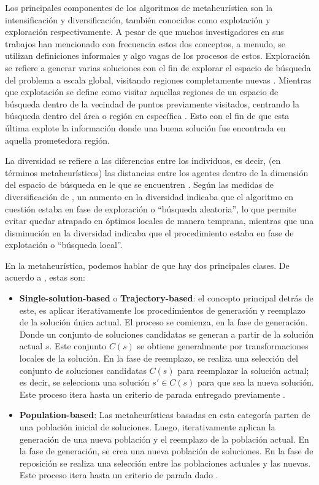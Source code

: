 Los principales componentes de los algoritmos de metaheurística son la intensificación y diversificación, también conocidos como explotación y exploración respectivamente. A pesar de que muchos investigadores en sus trabajos han mencionado con frecuencia estos dos conceptos, a menudo, se utilizan definiciones informales y algo vagas de los procesos de estos. Exploración se refiere a generar varias soluciones con el fin de explorar el espacio de búsqueda del problema a escala global, visitando regiones completamente nuevas \cite{metaheu-algo-modeling-optimization}. Mientras que explotación se define como visitar aquellas regiones de un espacio de búsqueda dentro de la vecindad de puntos previamente visitados, centrando la búsqueda dentro del área o región en específica \cite{10.1145/2480741.2480752}. Esto con el fin de que esta última explote la información donde una buena solución fue encontrada en aquella prometedora región.

La diversidad se refiere a las diferencias entre los individuos, es decir, (en términos metaheurísticos) las distancias entre los agentes dentro de la dimensión del espacio de búsqueda en le que se encuentren \cite{10.1145/2480741.2480752}. Según las medidas de diversificación de \cite{10.1145/2480741.2480752}, un aumento en la diversidad indicaba que el algoritmo en cuestión estaba en fase de exploración o ``búsqueda aleatoria'', lo que permite evitar quedar atrapado en óptimos locales de manera temprana, mientras que una disminución en la diversidad indicaba que el procedimiento estaba en fase de explotación o ``búsqueda local''.

En la metaheurística, podemos hablar de que hay dos principales clases. De acuerdo a \cite{10.5555/1718024}, estas son:
\begin{itemize}
    \item \textbf{Single-solution-based} o \textbf{Trajectory-based}: el concepto principal detrás de este, es aplicar iterativamente los procedimientos de generación y reemplazo de la solución única actual. El proceso se comienza, en la fase de generación. Donde un conjunto de soluciones candidatas se generan a partir de la solución actual $s$. Este conjunto $C(s)$ se obtiene generalmente por transformaciones locales de la solución. En la fase de reemplazo, se realiza una selección del conjunto de soluciones candidatas $C(s)$ para reemplazar la solución actual; es decir, se selecciona una solución $s' \in C(s)$ para que sea la nueva solución. Este proceso itera hasta un criterio de parada entregado previamente \cite{10.5555/1718024}.

    \item \textbf{Population-based}: Las metaheurísticas basadas en esta categoría parten de una población inicial de soluciones. Luego, iterativamente aplican la generación de una nueva población y el reemplazo de la población actual. En la fase de generación, se crea una nueva población de soluciones. En la fase de reposición se realiza una selección entre las poblaciones actuales y las nuevas. Este proceso itera hasta un criterio de parada dado \cite{10.5555/1718024}.

\end{itemize}

